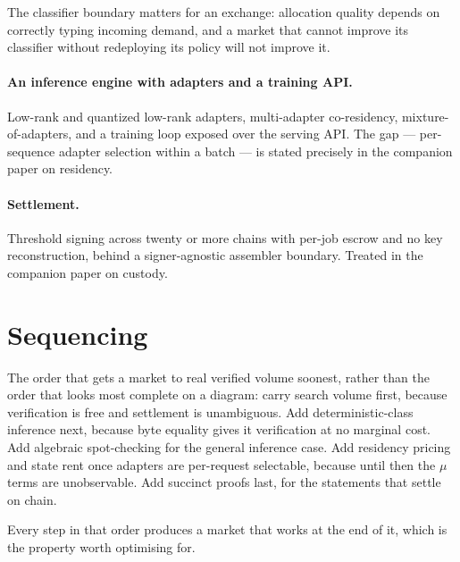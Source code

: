 \documentclass[11pt,a4paper]{article}
\begin{document}
The classifier boundary matters for an exchange: allocation quality depends on
correctly typing incoming demand, and a market that cannot improve its
classifier without redeploying its policy will not improve it.

\paragraph{An inference engine with adapters and a training API.} Low-rank and
quantized low-rank adapters, multi-adapter co-residency, mixture-of-adapters, and
a training loop exposed over the serving API. The gap --- per-sequence adapter
selection within a batch --- is stated precisely in the companion paper on
residency.

\paragraph{Settlement.} Threshold signing across twenty or more chains with
per-job escrow and no key reconstruction, behind a signer-agnostic assembler
boundary. Treated in the companion paper on custody.

\section{Sequencing}

The order that gets a market to real verified volume soonest, rather than the
order that looks most complete on a diagram: carry search volume first, because
verification is free and settlement is unambiguous. Add deterministic-class
inference next, because byte equality gives it verification at no marginal cost.
Add algebraic spot-checking for the general inference case. Add residency pricing
and state rent once adapters are per-request selectable, because until then the
$\mu$ terms are unobservable. Add succinct proofs last, for the statements that
settle on chain.

Every step in that order produces a market that works at the end of it, which is
the property worth optimising for.
\end{document}
